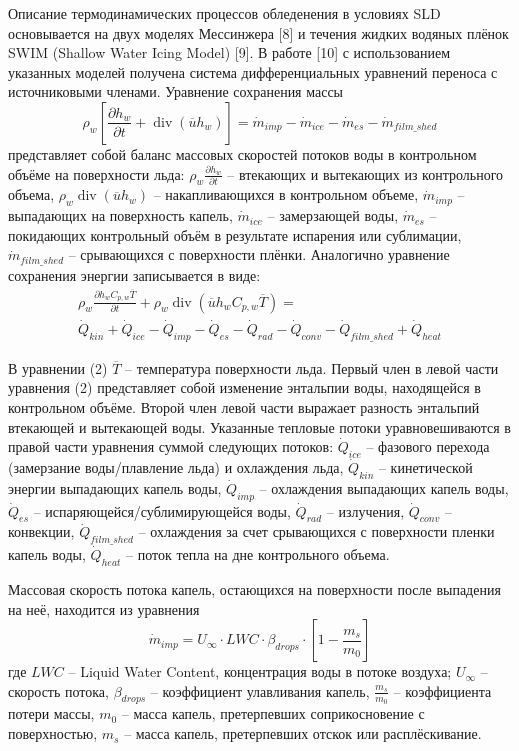 \documentclass{psta}%
\newcommand{\diver}{\mathop{\mathrm{div}}\nolimits}
\begin{document}
Описание термодинамических процессов обледенения в условиях SLD основывается на двух моделях Мессинжера [8] и течения жидких водяных плёнок SWIM (Shallow Water Icing Model) [9].
В работе [10] с использованием указанных моделей получена система дифференциальных уравнений переноса с источниковыми членами.
Уравнение сохранения массы
\begin{equation}
	\rho_w \left[ \frac{\partial h_w}{\partial t} + \diver(\overline{u} h_w) \right] = \dot{m}_{imp} - \dot{m}_{ice} - \dot{m}_{es} - \dot{m}_{film\_shed}
\end{equation}
представляет собой баланс массовых скоростей потоков воды в контрольном объёме на поверхности льда: $\rho_w \frac{\partial h_w}{\partial t}$ -- втекающих и вытекающих из контрольного объема, $\rho_w \diver(\overline{u} h_w)$ -- накапливающихся в контрольном объеме, $\dot{m}_{imp}$ -- выпадающих на поверхность капель, $\dot{m}_{ice}$ -- замерзающей воды, $\dot{m}_{es}$ -- покидающих контрольный объём в результате испарения или сублимации, $\dot{m}_{film\_shed}$ -- срывающихся с поверхности плёнки.
Аналогично уравнение сохранения энергии записывается в виде:
\begin{equation}
	\begin{aligned}
		\rho_w \frac{\partial h_w C_{p,w} \overline{T}}{\partial t} + \rho_w \diver(\overline{u} h_w C_{p,w} \overline{T}) = \\
		\dot{Q}_{kin} + \dot{Q}_{ice} - \dot{Q}_{imp} - \dot{Q}_{es} - \dot{Q}_{rad} - \dot{Q}_{conv} - \dot{Q}_{film\_shed} + \dot{Q}_{heat}
	\end{aligned}
\end{equation}

В уравнении (2) $\overline{T}$ -- температура поверхности льда.
Первый член в левой части уравнения (2) представляет собой изменение энтальпии воды, находящейся в контрольном объёме.
Второй член левой части выражает разность энтальпий втекающей и вытекающей воды.
Указанные тепловые потоки уравновешиваются в правой части уравнения суммой следующих потоков: $\dot{Q}_{ice}$ -- фазового перехода (замерзание воды/плавление льда) и охлаждения льда, $\dot{Q}_{kin}$ -- кинетической энергии выпадающих капель воды, $\dot{Q}_{imp}$ -- охлаждения выпадающих капель воды, $\dot{Q}_{es}$ -- испаряющейся/сублимирующейся воды, $\dot{Q}_{rad}$ -- излучения, $\dot{Q}_{conv}$ -- конвекции, $\dot{Q}_{film\_shed}$ -- охлаждения за счет срывающихся с поверхности пленки капель воды, $\dot{Q}_{heat}$ -- поток тепла на дне контрольного объема.

Массовая скорость потока капель, остающихся на поверхности после выпадения на неё, находится из уравнения
\begin{equation*}
	\dot{m}_{imp} = U_{\infty} \cdot LWC \cdot \beta_{drops} \cdot \left[ 1 - \frac{m_s}{m_0} \right]
\end{equation*}
где $LWC$ -- Liquid Water Content, концентрация воды в потоке воздуха; $U_{\infty}$ -- скорость потока, $\beta_{drops}$ -- коэффициент улавливания капель, $\frac{m_s}{m_0}$ -- коэффициента потери массы, $m_0$ -- масса капель, претерпевших соприкосновение с поверхностью, $m_s$ -- масса капель, претерпевших отскок или расплёскивание.
\end{document}
